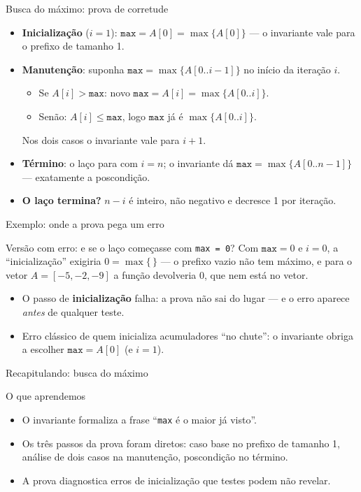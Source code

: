 \documentclass[aspectratio=169]{beamer}
\begin{document}
\begin{frame}{Busca do máximo: prova de corretude}
  \begin{itemize}
    \item \textbf{Inicialização} ($i = 1$): $\texttt{max} = A[0] = \max\{A[0]\}$
      --- o invariante vale para o prefixo de tamanho 1. \checkmark
    \item \textbf{Manutenção}: suponha $\texttt{max} = \max\{A[0..i-1]\}$ no início da iteração $i$.
      \begin{itemize}
        \item Se $A[i] > \texttt{max}$: novo $\texttt{max} = A[i] = \max\{A[0..i]\}$.
        \item Senão: $A[i] \leq \texttt{max}$, logo $\texttt{max}$ já é $\max\{A[0..i]\}$.
      \end{itemize}
      Nos dois casos o invariante vale para $i+1$. \checkmark
    \item \textbf{Término}: o laço para com $i = n$; o invariante dá
      $\texttt{max} = \max\{A[0..n-1]\}$ --- exatamente a poscondição. \checkmark
    \item \textbf{O laço termina?} $n - i$ é inteiro, não negativo e decresce 1 por iteração. \checkmark
  \end{itemize}
\end{frame}

\begin{frame}{Exemplo: onde a prova pega um erro}
  \begin{exampleblock}{Versão com erro: e se o laço começasse com \texttt{max = 0}?}
    Com $\texttt{max} = 0$ e $i = 0$, a ``inicialização'' exigiria
    $0 = \max\{\,\} $ --- o prefixo vazio não tem máximo, e para o vetor
    $A = [-5, -2, -9]$ a função devolveria $0$, que nem está no vetor.
  \end{exampleblock}
  \begin{itemize}
    \item O passo de \textbf{inicialização} falha: a prova não sai do lugar --- e o erro
      aparece \emph{antes} de qualquer teste.
    \item Erro clássico de quem inicializa acumuladores ``no chute'': o invariante obriga
      a escolher $\texttt{max} = A[0]$ (e $i = 1$).
  \end{itemize}
\end{frame}

\begin{frame}{Recapitulando: busca do máximo}
  \begin{block}{O que aprendemos}
    \begin{itemize}
      \item O invariante formaliza a frase ``\texttt{max} é o maior já visto''.
      \item Os três passos da prova foram diretos: caso base no prefixo de tamanho 1,
        análise de dois casos na manutenção, poscondição no término.
      \item A prova diagnostica erros de inicialização que testes podem não revelar.
    \end{itemize}
  \end{block}
\end{frame}
\end{document}

